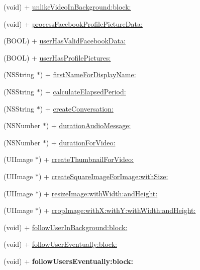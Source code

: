 \begin{DoxyCompactItemize}
\item 
(void) + \hyperlink{interface_e_s_utility_a1d7568fdf9615f67a2ac6d5976c9997b}{unlike\+Video\+In\+Background\+:block\+:}
\item 
(void) + \hyperlink{interface_e_s_utility_ad1ac500475771b72f9be5a02b1d25f10}{process\+Facebook\+Profile\+Picture\+Data\+:}
\item 
(B\+O\+O\+L) + \hyperlink{interface_e_s_utility_a3dbfa265258ca465605c82d7ab984bff}{user\+Has\+Valid\+Facebook\+Data\+:}
\item 
(B\+O\+O\+L) + \hyperlink{interface_e_s_utility_abd7c99c3e8cd92ca3c1d715f2e152a62}{user\+Has\+Profile\+Pictures\+:}
\item 
(N\+S\+String $\ast$) + \hyperlink{interface_e_s_utility_a58a1cf5deec44da0c45176de91491b56}{first\+Name\+For\+Display\+Name\+:}
\item 
(N\+S\+String $\ast$) + \hyperlink{interface_e_s_utility_a3332b068f490021c4ded5b2b3094558a}{calculate\+Elapsed\+Period\+:}
\item 
(N\+S\+String $\ast$) + \hyperlink{interface_e_s_utility_af00f4eb28ecf15dba4a1ca08b27e0e50}{create\+Conversation\+:}
\item 
(N\+S\+Number $\ast$) + \hyperlink{interface_e_s_utility_a8fc6b8b8ae5aed29155f12a325176f17}{duration\+Audio\+Message\+:}
\item 
(N\+S\+Number $\ast$) + \hyperlink{interface_e_s_utility_aa67e5ca077141f22c138e69706e9964f}{duration\+For\+Video\+:}
\item 
(U\+I\+Image $\ast$) + \hyperlink{interface_e_s_utility_a25f6f82001df03fb926ae031f1e39bf9}{create\+Thumbnail\+For\+Video\+:}
\item 
(U\+I\+Image $\ast$) + \hyperlink{interface_e_s_utility_a168c575b73d235fea819fa1ff8753af8}{create\+Square\+Image\+For\+Image\+:with\+Size\+:}
\item 
(U\+I\+Image $\ast$) + \hyperlink{interface_e_s_utility_a4d5084d5e9ed8c15ee37b4e2fcc2b54b}{resize\+Image\+:with\+Width\+:and\+Height\+:}
\item 
(U\+I\+Image $\ast$) + \hyperlink{interface_e_s_utility_a6062eb25918f9ba3843832ea2a1dfb0a}{crop\+Image\+:with\+X\+:with\+Y\+:with\+Width\+:and\+Height\+:}
\item 
(void) + \hyperlink{interface_e_s_utility_a10d41ac54ee259d9e524c6b61578c9d9}{follow\+User\+In\+Background\+:block\+:}
\item 
(void) + \hyperlink{interface_e_s_utility_aa0a9c9cc93a00f32193c88f5b7263f70}{follow\+User\+Eventually\+:block\+:}
\item 
\hypertarget{interface_e_s_utility_aefc5e012edc34e46c01abdc5816797ab}{}(void) + {\bfseries follow\+Users\+Eventually\+:block\+:}\label{interface_e_s_utility_aefc5e012edc34e46c01abdc5816797ab}


\end{DoxyCompactItemize}
